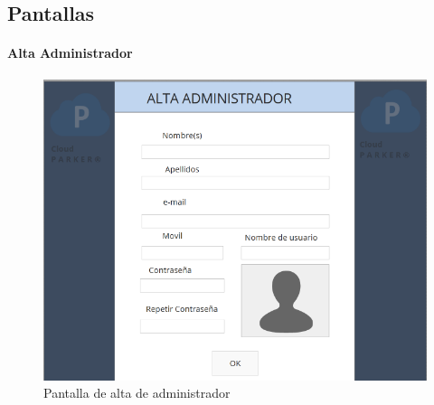 \subsection{Pantallas}

	\paragraph{Alta Administrador}	
		
		\begin{figure}[h]
			\centering
			\includegraphics[scale=.5]{./requerimientosDeSoftware/mapasDeNavegacion/source/altaAdministrador}
			\caption{Pantalla de alta de administrador}
			\label{md:altaAdministrador}
		\end{figure}